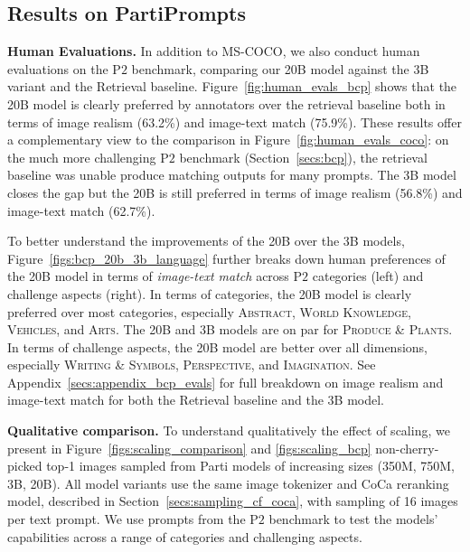 \subsection{Results on PartiPrompts}
\label{secs:evaluations_bcp}

\textbf{Human Evaluations.} In addition to MS-COCO, we also conduct human evaluations on the P$2$ benchmark, comparing our 20B model against the 3B variant and the Retrieval baseline. Figure~\ref{fig:human_evals_bcp} shows that the 20B model is clearly preferred by annotators over the retrieval baseline both in terms of image realism (63.2\%) and image-text match (75.9\%). These results offer a complementary view to the comparison in Figure~\ref{fig:human_evals_coco}: on the much more challenging P$2$ benchmark (Section~\ref{secs:bcp}), the retrieval baseline was unable produce matching outputs for many prompts. The 3B model closes the gap but the 20B is still preferred in terms of image realism (56.8\%) and image-text match (62.7\%).

To better understand the improvements of the 20B over the 3B models, Figure~\ref{figs:bcp_20b_3b_language} further breaks down human preferences of the 20B model in terms of \textit{image-text match} across P$2$ categories (left) and challenge aspects (right). In terms of categories, the 20B model is clearly preferred over most categories, especially \textsc{Abstract}, \textsc{World Knowledge}, \textsc{Vehicles}, and \textsc{Arts}. The 20B and 3B models are on par for \textsc{Produce \& Plants}. In terms of challenge aspects, the 20B model are better over all dimensions, especially \textsc{Writing \& Symbols}, \textsc{Perspective}, and \textsc{Imagination}. See Appendix~\ref{secs:appendix_bcp_evals} for full breakdown on image realism and image-text match for both the Retrieval baseline and the 3B model.

\textbf{Qualitative comparison.} To understand qualitatively the effect of scaling, we present in Figure~\ref{figs:scaling_comparison} and \ref{figs:scaling_bcp} non-cherry-picked top-1 images sampled from Parti models of increasing sizes (350M, 750M, 3B, 20B). All model variants use the same image tokenizer and CoCa reranking model, described in Section~\ref{secs:sampling_cf_coca}, with sampling of 16 images per text prompt. We use prompts from the P$2$ benchmark to test the models' capabilities across a range of categories and challenging aspects.

